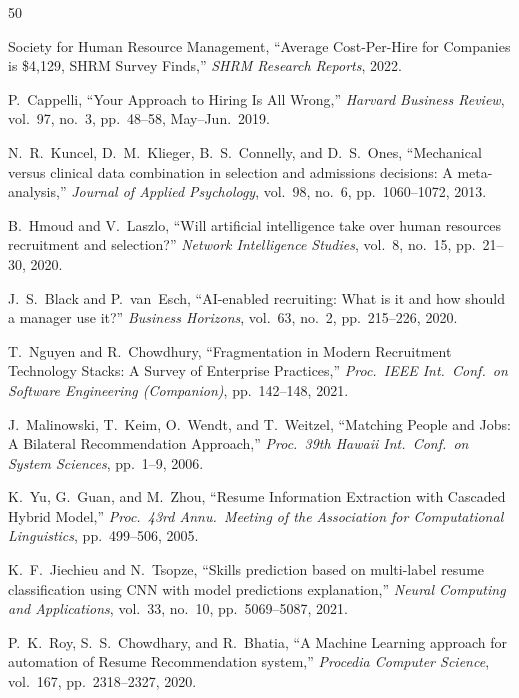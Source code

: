 \begin{thebibliography}{50}

Society for Human Resource Management, ``Average Cost-Per-Hire for Companies is \$4,129, SHRM Survey Finds,'' \textit{SHRM Research Reports}, 2022.

P.~Cappelli, ``Your Approach to Hiring Is All Wrong,'' \textit{Harvard Business Review}, vol.~97, no.~3, pp.~48--58, May--Jun.\ 2019.

N.~R.~Kuncel, D.~M.~Klieger, B.~S.~Connelly, and D.~S.~Ones, ``Mechanical versus clinical data combination in selection and admissions decisions: A meta-analysis,'' \textit{Journal of Applied Psychology}, vol.~98, no.~6, pp.~1060--1072, 2013.

B.~Hmoud and V.~Laszlo, ``Will artificial intelligence take over human resources recruitment and selection?'' \textit{Network Intelligence Studies}, vol.~8, no.~15, pp.~21--30, 2020.

J.~S.~Black and P.~van~Esch, ``AI-enabled recruiting: What is it and how should a manager use it?'' \textit{Business Horizons}, vol.~63, no.~2, pp.~215--226, 2020.

T.~Nguyen and R.~Chowdhury, ``Fragmentation in Modern Recruitment Technology Stacks: A Survey of Enterprise Practices,'' \textit{Proc.\ IEEE Int.\ Conf.\ on Software Engineering (Companion)}, pp.~142--148, 2021.

J.~Malinowski, T.~Keim, O.~Wendt, and T.~Weitzel, ``Matching People and Jobs: A Bilateral Recommendation Approach,'' \textit{Proc.\ 39th Hawaii Int.\ Conf.\ on System Sciences}, pp.~1--9, 2006.

K.~Yu, G.~Guan, and M.~Zhou, ``Resume Information Extraction with Cascaded Hybrid Model,'' \textit{Proc.\ 43rd Annu.\ Meeting of the Association for Computational Linguistics}, pp.~499--506, 2005.

K.~F.~Jiechieu and N.~Tsopze, ``Skills prediction based on multi-label resume classification using CNN with model predictions explanation,'' \textit{Neural Computing and Applications}, vol.~33, no.~10, pp.~5069--5087, 2021.

P.~K.~Roy, S.~S.~Chowdhary, and R.~Bhatia, ``A Machine Learning approach for automation of Resume Recommendation system,'' \textit{Procedia Computer Science}, vol.~167, pp.~2318--2327, 2020.


\end{thebibliography}

